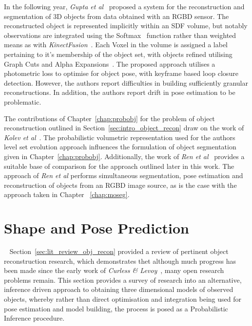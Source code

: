 In the following year, \textit{Gupta et al}~\cite{Gupta2016} proposed a system for the reconstruction and 
segmentation of 3D objects from data obtained with an RGBD sensor. The reconstructed object is represented 
implicitly within an SDF volume, but notably observations are integrated using the Softmax~\cite{Murphy2012ML} 
function rather than weighted means as with \textit{KinectFusion}~\cite{Newcombe2011}. Each Voxel in the 
volume is assigned a label pertaining to it's membership of the object set, with objects refined utilising 
Graph Cuts and Alpha Expansions~\cite{CLRS}. The proposed approach utilises a photometric loss to optimise 
for object pose, with keyframe based loop closure detection. However, the authors report difficulties in 
building sufficiently granular reconstructions. In addition, the authors report drift in pose estimation 
to be problematic.

The contributions of Chapter~\ref{chap:probobj} for the problem of object reconstruction outlined in 
Section~\ref{sec:intro_object_recon} draw on the work of \textit{Kolev et al}~\cite{Kolev2006}. The 
probabilistic volumetric representation used for the authors level set evolution approach influences the 
formulation of object segmentation given in Chapter~\ref{chap:probobj}. Additionally, the work of 
\textit{Ren et al}~\cite{Ren2013} provides a suitable base of comparison for the approach outlined later 
in this work. The approach of \textit{Ren et al} performs simultaneous segmentation, pose estimation and 
reconstruction of objects from an RGBD image source, as is the case with the approach taken in Chapter
~\ref{chap:moseg}.

\section{Shape and Pose Prediction}
~\label{sec:lit_review_prediction}
Section~\ref{sec:lit_review_obj_recon} provided a review of pertinent object reconstruction research, 
which demonstrates thet although much progress has been made since the early work of \textit{Curless \& 
Levoy}~\cite{Curless1996}, many open research problems remain. This section provides a survey of research 
into an alternative, inference driven approach to obtaining three dimensional models of observed 
objects, whereby rather than direct optimisation and integration being used for pose estimation and 
model building, the process is posed as a Probabilistic Inference procedure.

